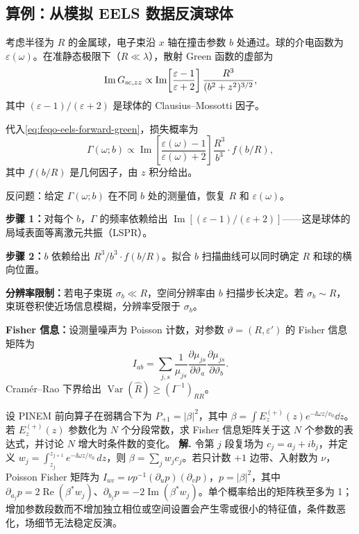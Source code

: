 \subsection{算例：从模拟 EELS 数据反演球体}

\begin{workedexample}[球体 EELS 反演]
考虑半径为 \(R\) 的金属球，电子束沿 \(x\) 轴在撞击参数 \(b\) 处通过。球的介电函数为 \(\varepsilon(\omega)\)。在准静态极限下（\(R\ll\lambda\)），散射 Green 函数的虚部为
\[
\operatorname{Im}G_{{\rm sc},zz}\propto
\operatorname{Im}\!\left[\frac{\varepsilon-1}{\varepsilon+2}\right]
\frac{R^3}{(b^2+z^2)^{3/2}},
\]
其中 \((\varepsilon-1)/(\varepsilon+2)\) 是球体的 Clausius--Mossotti 因子。

代入\cref{eq:feqo-eels-forward-green}，损失概率为
\[
\Gamma(\omega;b)\propto
\operatorname{Im}\!\left[\frac{\varepsilon(\omega)-1}{\varepsilon(\omega)+2}\right]
\frac{R^3}{b^3}\cdot f(b/R),
\]
其中 \(f(b/R)\) 是几何因子，由 \(z\) 积分给出。

反问题：给定 \(\Gamma(\omega;b)\) 在不同 \(b\) 处的测量值，恢复 \(R\) 和 \(\varepsilon(\omega)\)。

\textbf{步骤 1：}对每个 \(b\)，\(\Gamma\) 的频率依赖给出 \(\operatorname{Im}[(\varepsilon-1)/(\varepsilon+2)]\)——这是球体的局域表面等离激元共振（LSPR）。

\textbf{步骤 2：}\(b\) 依赖给出 \(R^3/b^3\cdot f(b/R)\)。拟合 \(b\) 扫描曲线可以同时确定 \(R\) 和球的横向位置。

\textbf{分辨率限制：}若电子束斑 \(\sigma_b\ll R\)，空间分辨率由 \(b\) 扫描步长决定。若 \(\sigma_b\sim R\)，束斑卷积使近场信息模糊，分辨率受限于 \(\sigma_b\)。

\textbf{Fisher 信息：}设测量噪声为 Poisson 计数，对参数 \(\vartheta=(R,\varepsilon')\) 的 Fisher 信息矩阵为
\[
I_{ab}=\sum_{j,s}\frac{1}{\mu_{js}}
\frac{\partial\mu_{js}}{\partial\vartheta_a}
\frac{\partial\mu_{js}}{\partial\vartheta_b}.
\]
Cram\'er--Rao 下界给出 \(\operatorname{Var}(\hat R)\geq(I^{-1})_{RR}\)。
\end{workedexample}


\par
\begin{workedexample}
设 PINEM 前向算子在弱耦合下为 \(P_{+1}=|\beta|^2\)，其中 \(\beta=\int E_z^{(+)}(z)e^{-\ii\omega z/v_0}\dd z\)。若 \(E_z^{(+)}(z)\) 参数化为 \(N\) 个分段常数，求 Fisher 信息矩阵关于这 \(N\) 个参数的表达式，并讨论 \(N\) 增大时条件数的变化。
\textbf{解.} 令第 \(j\) 段复场为 \(c_j=a_j+ib_j\)，并定义 \(w_j=\int_{z_j}^{z_{j+1}}e^{-\ii\omega z/v_0}\,dz\)，则 \(\beta=\sum_jw_jc_j\)。若只计数 \(+1\) 边带、入射数为 \(\nu\)，Poisson Fisher 矩阵为 \(I_{uv}=\nu p^{-1}(\partial_up)(\partial_vp)\)，\(p=|\beta|^2\)，其中 \(\partial_{a_j}p=2\operatorname{Re}(\beta^*w_j)\)、\(\partial_{b_j}p=-2\operatorname{Im}(\beta^*w_j)\)。单个概率给出的矩阵秩至多为 1；增加参数段数而不增加独立相位或空间设置会产生零或很小的特征值，条件数恶化，场细节无法稳定反演。
\end{workedexample}
\par
